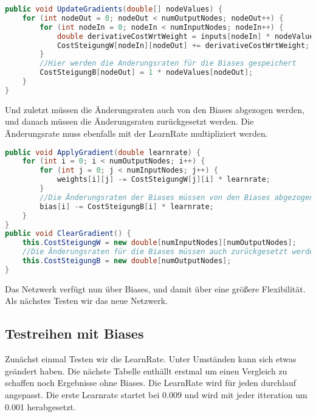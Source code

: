 \documentclass[12pt]{article}
\begin{document}
\begin{lstlisting}[language=Java]
public void UpdateGradients(double[] nodeValues) {
    for (int nodeOut = 0; nodeOut < numOutputNodes; nodeOut++) {
        for (int nodeIn = 0; nodeIn < numInputNodes; nodeIn++) {
            double derivativeCostWrtWeight = inputs[nodeIn] * nodeValues[nodeOut];
            CostSteigungW[nodeIn][nodeOut] += derivativeCostWrtWeight;
        }
        //Hier werden die Anderungsraten für die Biases gespeichert
        CostSteigungB[nodeOut] = 1 * nodeValues[nodeOut];
    }
}
\end{lstlisting}Und zuletzt  müssen die Änderungsraten auch von den Biases abgezogen werden, und danach müssen die Änderungsraten zurückgesetzt werden. Die Änderungsrate muss ebenfalls mit der LearnRate multipliziert werden.\begin{lstlisting}[language=Java]
public void ApplyGradient(double learnrate) {
    for (int i = 0; i < numOutputNodes; i++) {
        for (int j = 0; j < numInputNodes; j++) {
            weights[i][j] -= CostSteigungW[j][i] * learnrate;
        }
        //Die Änderungsraten der Biases müssen von den Biases abgezogen werden
        bias[i] -= CostSteigungB[i] * learnrate;
    }
}
public void ClearGradient() {
    this.CostSteigungW = new double[numInputNodes][numOutputNodes];
    //Die Änderungsraten für die Biases müssen auch zurückgesetzt werden
    this.CostSteigungB = new double[numOutputNodes];
}
\end{lstlisting}Das Netzwerk verfügt nun über Biases, und damit über eine größere Flexibilität. Als nächstes Testen wir das neue Netzwerk.
\subsection{ Testreihen mit Biases}
Zunächst einmal Testen wir die LearnRate. Unter Umständen kann sich etwas geändert haben.
Die nächste Tabelle enthällt erstmal um einen Vergleich zu schaffen noch Ergebnisse ohne Biases. Die LearnRate wird für jeden durchlauf angepasst. Die erste Learnrate startet bei 0.009 und wird mit jeder itteration um 0.001 herabgesetzt.
\end{document}
